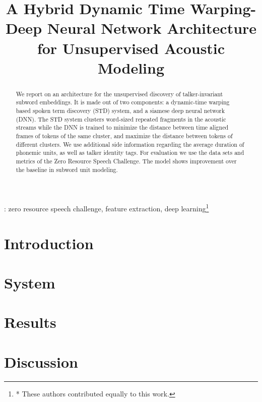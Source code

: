 \documentclass[a4paper]{article}
\title{A Hybrid Dynamic Time Warping-Deep Neural Network Architecture for Unsupervised Acoustic Modeling}
\begin{document}
\maketitle

\begin{abstract}
We report on an architecture for the unsupervised discovery of talker-invariant subword embeddings. It is made out of two components: a dynamic-time warping based spoken term discovery (STD) system, and a siamese deep neural network (DNN). The STD system clusters word-sized repeated fragments in the acoustic streams while the DNN is trained to minimize the distance between time aligned frames of tokens of the same cluster, and maximize the distance between tokens of different clusters. We use additional side information regarding the average duration of phonemic units, as well as talker identity tags. For evaluation we use the data sets and metrics of the Zero Resource Speech Challenge. The model shows improvement over the baseline in subword unit modeling. 
\end{abstract}
: zero resource speech challenge, feature extraction, deep learning\let\thefootnote\relax\footnote{* These authors contributed equally to this work.}


\section{Introduction}
\section{System}
\section{Results}
\section{Discussion}
\end{document}
